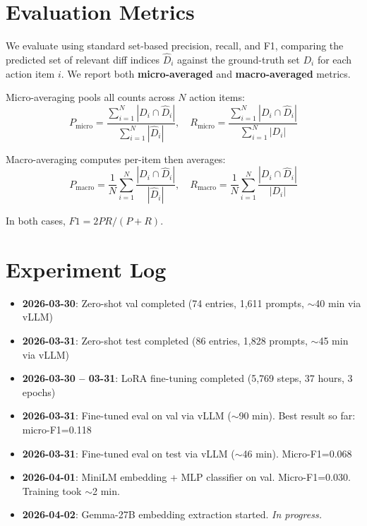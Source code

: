 \documentclass[11pt]{article}
\begin{document}
\section{Evaluation Metrics}

We evaluate using standard set-based precision, recall, and F1, comparing the predicted set of relevant diff indices $\hat{D}_i$ against the ground-truth set $D_i$ for each action item $i$. We report both \textbf{micro-averaged} and \textbf{macro-averaged} metrics.

Micro-averaging pools all counts across $N$ action items:
\begin{equation}
P_{\text{micro}} = \frac{\sum_{i=1}^{N} |D_i \cap \hat{D}_i|}{\sum_{i=1}^{N} |\hat{D}_i|}, \quad
R_{\text{micro}} = \frac{\sum_{i=1}^{N} |D_i \cap \hat{D}_i|}{\sum_{i=1}^{N} |D_i|}
\end{equation}

Macro-averaging computes per-item then averages:
\begin{equation}
P_{\text{macro}} = \frac{1}{N}\sum_{i=1}^{N} \frac{|D_i \cap \hat{D}_i|}{|\hat{D}_i|}, \quad
R_{\text{macro}} = \frac{1}{N}\sum_{i=1}^{N} \frac{|D_i \cap \hat{D}_i|}{|D_i|}
\end{equation}

In both cases, $F1 = 2PR/(P+R)$.

\section{Experiment Log}

\begin{itemize}
\item \textbf{2026-03-30}: Zero-shot val completed (74 entries, 1{,}611 prompts, $\sim$40 min via vLLM)
\item \textbf{2026-03-31}: Zero-shot test completed (86 entries, 1{,}828 prompts, $\sim$45 min via vLLM)
\item \textbf{2026-03-30 -- 03-31}: LoRA fine-tuning completed (5{,}769 steps, 37 hours, 3 epochs)
\item \textbf{2026-03-31}: Fine-tuned eval on val via vLLM ($\sim$90 min). Best result so far: micro-F1=0.118
\item \textbf{2026-03-31}: Fine-tuned eval on test via vLLM ($\sim$46 min). Micro-F1=0.068
\item \textbf{2026-04-01}: MiniLM embedding + MLP classifier on val. Micro-F1=0.030. Training took $\sim$2 min.
\item \textbf{2026-04-02}: Gemma-27B embedding extraction started. \textit{In progress.}
\end{itemize}
\end{document}
